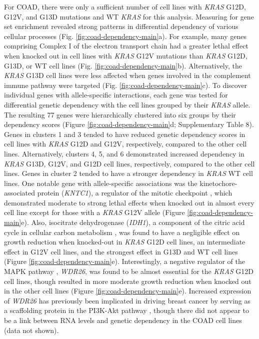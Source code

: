 \documentclass[english, 10pt, letterpaper]{article}
\newcommand{\KRAS}{\emph{KRAS}}
\begin{document}
For COAD, there were only a sufficient number of cell lines with \KRAS{} G12D, G12V, and G13D mutations and WT \KRAS{} for this analysis.
Measuring for gene set enrichment revealed strong patterns in differential dependency of various cellular processes (Fig. \ref{fig:coad-dependency-main}a).
For example, many genes comprising Complex I of the electron transport chain had a greater lethal effect when knocked out in cell lines with \KRAS{} G12V mutations than \KRAS{} G12D, G13D, or WT cell lines (Fig. \ref{fig:coad-dependency-main}b).
Alternatively, the \KRAS{} G13D cell lines were less affected when genes involved in the complement immune pathway were targeted (Fig. \ref{fig:coad-dependency-main}c).
To discover individual genes with allele-specific interactions, each gene was tested for differential genetic dependency with the cell lines grouped by their \KRAS{} allele.
The resulting 77 genes were hierarchically clustered into six groups by their dependency scores (Figure \ref{fig:coad-dependency-main}d; Supplementary Table 8).
Genes in clusters 1 and 3 tended to have reduced genetic dependency scores in cell lines with \KRAS{} G12D and G12V, respectively, compared to the other cell lines.
Alternatively, clusters 4, 5, and 6 demonstrated increased dependency in \KRAS{} G13D, G12V, and G12D cell lines, respectively, compared to the other cell lines.
Genes in cluster 2 tended to have a stronger dependency in \KRAS{} WT cell lines.
One notable gene with allele-specific associations was the kinetochore-associated protein (\emph{KNTC1}), a regulator of the mitotic checkpoint \cite{Chan2000HumanKinetochores., Scaerou2001TheKinetochore., Kops2005ZW10Kinetochore.}, which demonstrated moderate to strong lethal effects when knocked out in almost every cell line except for those with a \KRAS{} G12V allele (Figure \ref{fig:coad-dependency-main}e).
Also, isocitrate dehydrogenase (\emph{IDH1}), a component of the citric acid cycle in cellular carbon metabolism \cite{Geisbrecht1999TheDehydrogenase.}, was found to have a negligible effect on growth reduction when knocked-out in \KRAS{} G12D cell lines, an intermediate effect in G12V cell lines, and the strongest effect in G13D and WT cell lines (Figure \ref{fig:coad-dependency-main}e).
Interestingly, a negative regulator of the MAPK pathway \cite{Goto2016WDR26Pathway.}, \emph{WDR26}, was found to be almost essential for the \KRAS{} G12D cell lines, though resulted in more moderate growth reduction when knocked out in the other cell lines (Figure \ref{fig:coad-dependency-main}e).
Increased expression of \emph{WDR26} has previously been implicated in driving breast cancer by serving as a scaffolding protein in the PI3K-Akt pathway \cite{Ye2016UpregulatedInvasion.}, though there did not appear to be a link between RNA levels and genetic dependency in the COAD cell lines (data not shown).
\end{document}
